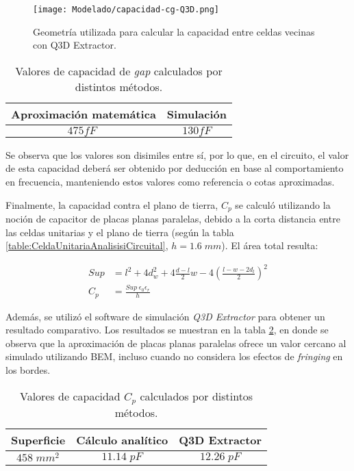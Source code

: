 \begin{figure}[h]
	\centering
	\texttt{[image: Modelado/capacidad-cg-Q3D.png]}
	\caption{Geometría utilizada para calcular la capacidad entre celdas vecinas con Q3D Extractor.}
	\label{fig:capacidad-cg-Q3D}
\end{figure}

\begin{table}
	\centering
	\begin{tabular}{|c|c|}
		\hline 
		Aproximación matemática & Simulación \\ 
		\hline 
		$475 fF\;$ & $130 fF$\\ 
		\hline 
	\end{tabular}
	\caption{Valores de capacidad de \textit{gap} calculados por distintos métodos.}
	\label{table:Cg}
\end{table}

Se observa que los valores son disimiles entre sí, por lo que, en el circuito, el valor de esta capacidad deberá ser obtenido por deducción en base al comportamiento en frecuencia, manteniendo estos valores como referencia o cotas aproximadas.

Finalmente, la capacidad contra el plano de tierra, $C_p$ se calculó utilizando la noción de capacitor de placas planas paralelas, debido a la corta distancia entre las celdas unitarias y el plano de tierra (según la tabla \ref{table:CeldaUnitariaAnalisisiCircuital}, $h=1.6\;mm$). El área total resulta:

\begin{align}
	Sup &= l^2+4 d_w^2+4 \frac{d-l}{2} w - 4 \left(\frac{l-w-2 d_l}{2}\right)^2 \\
	C_{p} &= \frac{Sup\; \epsilon_0 \epsilon_r}{h}
\end{align}

Además, se utilizó el software de simulación \textit{Q3D Extractor} para obtener un resultado comparativo. Los resultados se muestran en la tabla \ref{table:Cp-modelo1-circuital}, en donde se observa que la aproximación de placas planas paralelas ofrece un valor cercano al simulado utilizando BEM, incluso cuando no considera los efectos de \textit{fringing} en los bordes.

\begin{table}
	\centering
	\begin{tabular}{|c|c|c|}
		\hline 
		Superficie & Cálculo analítico & Q3D Extractor\\ 
		\hline 
		$458\; mm^2$ & $11.14\;pF$ & $12.26\;pF$\\ 
		\hline 
	\end{tabular}
	\caption{Valores de capacidad $C_p$ calculados por distintos métodos.}
	\label{table:Cp-modelo1-circuital}
\end{table}

